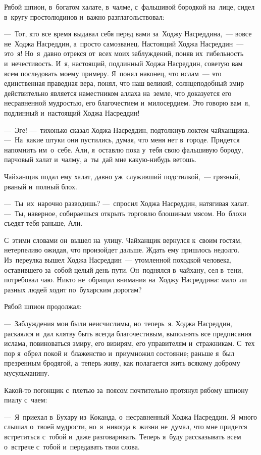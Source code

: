 \documentclass[12pt,a4paper]{book}
\begin{document}
Рябой шпион, в~богатом халате, в~чалме, с~фальшивой бородкой на~лице, сидел в~кругу простолюдинов и~важно разглагольствовал:

—~Тот, кто все время выдавал себя перед вами за~Ходжу Насреддина,~— вовсе не~Ходжа Насреддин, а~просто самозванец. Настоящий Ходжа Насреддин~— это~я! Но~я~давно отрекся от~всех моих заблуждений, поняв их~гибельность и~нечестивость. И~я, настоящий, подлинный Ходжа Насреддин, советую вам всем последовать моему примеру. Я~понял наконец, что ислам~— это единственная праведная вера, понял, что наш великий, солнцеподобный эмир действительно является наместником аллаха на~земле, что доказуется его несравненной мудростью, его благочестием и~милосердием. Это говорю вам~я, подлинный и~настоящий Ходжа Насреддин!

—~Эге! —~тихонько сказал Ходжа Насреддин, подтолкнув локтем чайханщика. —~На~какие штуки они пустились, думая, что меня нет в~городе. Придется напомнить им~о~себе. Али, я~оставлю пока у~тебя свою фальшивую бороду, парчовый халат и~чалму, а~ты~дай мне какую-нибудь ветошь.

Чайханщик подал ему халат, давно уж~служивший подстилкой,~— грязный, рваный и~полный блох.

—~Ты~их~нарочно разводишь? —~спросил Ходжа Насреддин, натягивая халат. —~Ты, наверное, собираешься открыть торговлю блошиным мясом. Но~блохи съедят тебя раньше, Али.

С~этими словами он~вышел на~улицу. Чайханщик вернулся к~своим гостям, нетерпеливо ожидая, что произойдет дальше. Ждать ему пришлось недолго. Из~переулка вышел Ходжа Насреддин~— утомленной походкой человека, оставившего за~собой целый день пути. Он~поднялся в~чайхану, сел в~тени, потребовал чаю. Никто не~обращал внимания на~Ходжу Насреддина: мало~ли разных людей ходит по~бухарским дорогам?

Рябой шпион продолжал:

—~Заблуждения мои были неисчислимы, но~теперь~я. Ходжа Насреддин, раскаялся и~дал клятву быть всегда благочестивым, выполнять все предписания ислама, повиноваться эмиру, его визирям, его управителям и~стражникам. С~тех пор я~обрел покой и~блаженство и~приумножил состояние; раньше я~был презренным бродягой, а~теперь живу, как полагается жить всякому доброму мусульманину.

Какой-то погонщик с~плетью за~поясом почтительно протянул рябому шпиону пиалу с~чаем:

—~Я~приехал в~Бухару из~Коканда, о~несравненный Ходжа Насреддин. Я~много слышал о~твоей мудрости, но~я~никогда в~жизни не~думал, что мне придется встретиться с~тобой и~даже разговаривать. Теперь я~буду рассказывать всем о~встрече с~тобой и~передавать твои слова.
\end{document}
